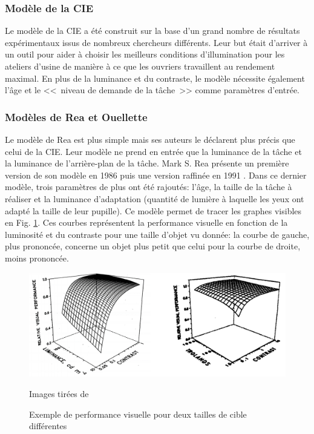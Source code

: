 	\subsubsection{Modèle de la CIE}
	\par Le modèle de la CIE a été construit sur la base d'un grand nombre de résultats expérimentaux issus de nombreux chercheurs différents. Leur but était d'arriver à un outil pour aider à choisir les meilleurs conditions d'illumination pour les ateliers d'usine de manière à ce que les ouvriers travaillent au rendement maximal. En plus de la luminance et du contraste, le modèle nécessite également l'âge et le <<~niveau de demande de la tâche~>> comme paramètres d'entrée.
	
	\subsubsection{Modèles de Rea et Ouellette}
	\par Le modèle de Rea est plus simple mais ses auteurs le déclarent plus précis que celui de la CIE. Leur modèle ne prend en entrée que la luminance de la tâche et la luminance de l'arrière-plan de la tâche. Mark S. Rea présente un première version de son modèle en 1986 \citep{rea_toward_1986} puis une version raffinée en 1991 \citep{rea_relative_1991}. Dans ce dernier modèle, trois paramètres de plus ont été rajoutés: l'âge, la taille de la tâche à réaliser et la luminance d'adaptation (quantité de lumière à laquelle les yeux ont adapté la taille de leur pupille). Ce modèle permet de tracer les graphes visibles en Fig. \ref{fig:courbes_rea}. Ces courbes représentent la performance visuelle en fonction de la luminosité et du contraste pour une taille d'objet vu donnée: la courbe de gauche, plus prononcée, concerne un objet plus petit que celui pour la courbe de droite, moins prononcée.
	
	\begin{figure}[h]
		\centering
		\includegraphics[scale=.5]{Figures/CourbesReaExemple}
		\caption{Exemple de performance visuelle pour deux tailles de cible différentes}{Images tirées de \citep{rea_relative_1991}}
		\label{fig:courbes_rea}
	\end{figure}
	
